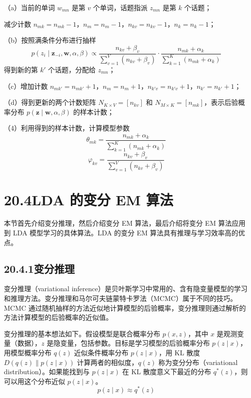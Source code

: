 \documentclass[UTF8, 12pt, fontset=fandol, oneside]{ctexart}
\begin{document}
\quad （a）当前的单词 $w_{mn}$ 是第 $v$ 个单词，话题指派 $z_{mn}$ 是第 $k$ 个话题；

\quad 减少计数 $n_{mk}=n_{mk}-1$，$n_m=n_m-1$，$n_{kv}=n_{kv}-1$，$n_k=n_k-1$；

\quad （b）按照满条件分布进行抽样
\[
p(z_i\mid\mathbf{z}_{-i},\mathbf{w},\alpha,\beta)\propto \frac{n_{kv}+\beta_v}{\sum_{v=1}^V(n_{kv}+\beta_v)}\cdot \frac{n_{mk}+\alpha_k}{\sum_{k=1}^K(n_{mk}+\alpha_k)}
\]
\quad 得到新的第 $k'$ 个话题，分配给 $z_{mn}$；

\quad （c）增加计数 $n_{mk'}=n_{mk'}+1$，$n_m=n_m+1$，$n_{k'v}=n_{k'v}+1$，$n_{k'}=n_{k'}+1$；

\quad （d）得到更新的两个计数矩阵 $N_{K\times V}=[n_{kv}]$ 和 $N_{M\times K}=[n_{mk}]$，表示后验概率分布 $p(\mathbf{z}\mid\mathbf{w},\alpha,\beta)$ 的样本计数；

（4）利用得到的样本计数，计算模型参数
\[
\theta_{mk}=\frac{n_{mk}+\alpha_k}{\sum_{k=1}^K(n_{mk}+\alpha_k)}
\]
\[
\varphi_{kv}=\frac{n_{kv}+\beta_v}{\sum_{v=1}^V(n_{kv}+\beta_v)}
\]

\section*{20.4\quad LDA 的变分 EM 算法}

本节首先介绍变分推理，然后介绍变分 EM 算法，最后介绍将变分 EM 算法应用到 LDA 模型学习的具体算法。LDA 的变分 EM 算法具有推理与学习效率高的优点。

\subsection*{20.4.1\quad 变分推理}

变分推理（variational inference）是贝叶斯学习中常用的、含有隐变量模型的学习和推理方法。变分推理和马尔可夫链蒙特卡罗法（MCMC）属于不同的技巧。MCMC 通过随机抽样的方法近似地计算模型的后验概率，变分推理则通过解析的方法计算模型的后验概率的近似值。

变分推理的基本想法如下。假设模型是联合概率分布 $p(x,z)$，其中 $x$ 是观测变量（数据），$z$ 是隐变量，包括参数。目标是学习模型的后验概率分布 $p(z\mid x)$，用模型概率分布 $q(z)$ 近似条件概率分布 $p(z\mid x)$，用 KL 散度 $D(q(z)\|p(z\mid x))$ 计算两者的相似度，$q(z)$ 称为变分分布（variational distribution）。如果能找到与 $p(z\mid x)$ 在 KL 散度意义下最近的分布 $q^*(z)$，则可以用这个分布近似 $p(z\mid x)$。
\begin{equation}
p(z\mid x)\approx q^*(z)
\tag{20.34}
\end{equation}
\end{document}
